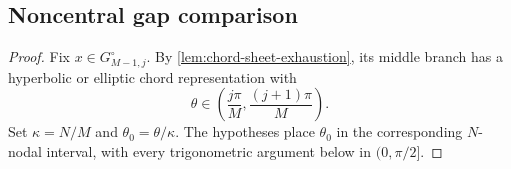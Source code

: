 \documentclass[10pt,twoside]{siamart1116}
\numberwithin{equation}{section}
\begin{document}
\subsection{Noncentral gap comparison}
\label{subsec:noncentral-comparison}


\begin{proof}
Fix \(x\in G_{M-1,j}^{\circ}\).  By
\cref{lem:chord-sheet-exhaustion}, its middle branch has a hyperbolic or
elliptic chord representation with
\[
 \theta\in\left(\frac{j\pi}{M},\frac{(j+1)\pi}{M}\right).
\]
Set \(\kappa=N/M\) and \(\theta_0=\theta/\kappa\).  The hypotheses place
\(\theta_0\) in the corresponding \(N\)-nodal interval, with every
trigonometric argument below in \((0,\pi/2]\).


\end{proof}
\end{document}
